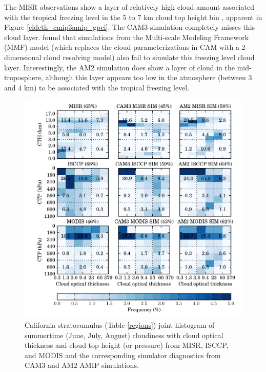 The MISR observations show a layer of relatively high cloud amount associated with the tropical freezing level in the $5$ to $7$ km cloud top height bin \citep{johnson_et_al_1999}, apparent in Figure \ref{cldcth_cmip3amip_gpci}. The CAM3 simulation completely misses this cloud layer. \cite{marchand_and_ackerman_2010} found that simulations from the Multi-scale Modeling Framework (MMF) model (which replaces the cloud parameterizations in CAM with a 2-dimensional cloud resolving model) also fail to simulate this freezing level cloud layer. Interestingly, the AM2 simulation does show a layer of cloud in the mid-troposphere, although this layer appears too low in the atmosphere (between $3$ and $4$ km) to be associated with the tropical freezing level.
\begin{figure}
    \centering
    \includegraphics{../graphics/hist2d_cmip3amip_twp.pdf}
    \caption[Tropical western Pacific joint histogram of summertime cloudiness with cloud optical thickness and cloud top height from MISR, ISCCP, and MODIS and the corresponding simulator diagnostics from CAM3 and AM2 AMIP simulations.]{California stratocumulus (Table \ref{regions}) joint histogram of summertime (June, July, August) cloudiness with cloud optical thickness and cloud top height (or pressure) from MISR, ISCCP, and MODIS and the corresponding simulator diagnostics from CAM3 and AM2 AMIP simulations.}
    \label{hist2d_cmip3amip_twp}
\end{figure}

